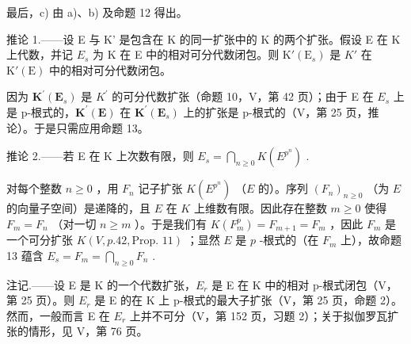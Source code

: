 最后，c) 由 a)、b) 及命题 12 得出。

推论 1.——设 E 与 K' 是包含在 K 的同一扩张中的 K 的两个扩张。假设 E 在 K 上代数，并记 \(E_{s}\) 为 K 在 E 中的相对可分代数闭包。则 \(\mathrm{K}'(\mathrm{E}_{s})\) 是 \(K'\) 在 \(\mathrm{K}'(\mathrm{E})\) 中的相对可分代数闭包。

因为 \(\mathbf{K}^{\prime}(\mathbf{E}_{s})\) 是 \(K^{\prime}\) 的可分代数扩张（命题 10，V，第 42 页）；由于 E 在 \(E_{s}\) 上是 p-根式的，\(\mathbf{K}^{\prime}(\mathbf{E})\) 在 \(\mathbf{K}^{\prime}(\mathbf{E}_{s})\) 上的扩张是 p-根式的（V，第 25 页，推论）。于是只需应用命题 13。

推论 2.——若 E 在 K 上次数有限，则 \(E_{s} = \bigcap_{n \geqslant 0} K(E^{p^{n}})\) .

对每个整数 \(n \geqslant 0\) ，用 \(F_n\) 记子扩张 \(K(E^{p^n})\) （\(E\) 的）。序列 \((F_n)_{n \geqslant 0}\) （为 \(E\) 的向量子空间）是递降的，且 \(E\) 在 \(K\) 上维数有限。因此存在整数 \(m \geqslant 0\) 使得 \(F_m = F_n\) （对一切 \(n \geqslant m\) ）。于是我们有 \(K(F_m^p) = F_{m+1} = F_m\) ，因此 \(F_m\) 是一个可分扩张 \(K(V, p. 42, \text{Prop. } 11)\) ；显然 \(E\) 是 \(p\) -根式的（在 \(F_m\) 上），故命题 13 蕴含 \(E_s = F_m = \bigcap_{n \geqslant 0} F_n\) .

注记.——设 E 是 K 的一个代数扩张，\(E_{r}\) 是 E 在 K 中的相对 p-根式闭包（V，第 25 页）。则 \(E_{r}\) 是 E 的在 K 上 p-根式的最大子扩张（V，第 25 页，命题 2）。然而，一般而言 E 在 \(E_{r}\) 上并不可分（V，第 152 页，习题 2）；关于拟伽罗瓦扩张的情形，见 V，第 76 页。

